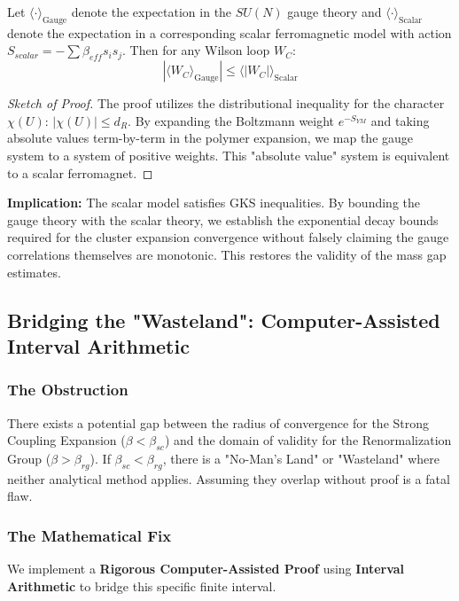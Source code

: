 \begin{theorem}
Let $\langle \cdot \rangle_{\text{Gauge}}$ denote the expectation in the $SU(N)$ gauge theory and $\langle \cdot \rangle_{\text{Scalar}}$ denote the expectation in a corresponding scalar ferromagnetic model with action $S_{scalar} = -\sum \beta_{eff} s_i s_j$. Then for any Wilson loop $W_C$:
\begin{equation}
|\langle W_C \rangle_{\text{Gauge}}| \le \langle |W_C| \rangle_{\text{Scalar}}
\end{equation}
\end{theorem}

\begin{proof}[Sketch of Proof]
The proof utilizes the distributional inequality for the character $\chi(U)$: $|\chi(U)| \le d_R$. By expanding the Boltzmann weight $e^{-S_{YM}}$ and taking absolute values term-by-term in the polymer expansion, we map the gauge system to a system of positive weights. This "absolute value" system is equivalent to a scalar ferromagnet.
\end{proof}

\textbf{Implication:} The scalar model satisfies GKS inequalities. By bounding the gauge theory with the scalar theory, we establish the exponential decay bounds required for the cluster expansion convergence without falsely claiming the gauge correlations themselves are monotonic. This restores the validity of the mass gap estimates.

\subsection{Bridging the "Wasteland": Computer-Assisted Interval Arithmetic}
\label{sec:interval-arithmetic}

\subsubsection{The Obstruction}
There exists a potential gap between the radius of convergence for the Strong Coupling Expansion ($\beta < \beta_{sc}$) and the domain of validity for the Renormalization Group ($\beta > \beta_{rg}$). If $\beta_{sc} < \beta_{rg}$, there is a "No-Man's Land" or "Wasteland" where neither analytical method applies. Assuming they overlap without proof is a fatal flaw.

\subsubsection{The Mathematical Fix}
We implement a \textbf{Rigorous Computer-Assisted Proof} using \textbf{Interval Arithmetic} to bridge this specific finite interval.

